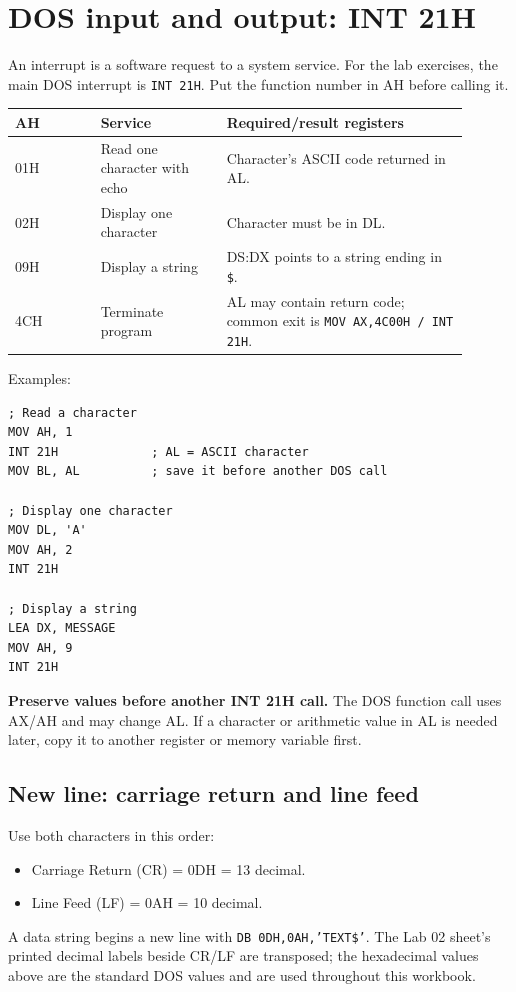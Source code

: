 \documentclass[11pt,a4paper]{article}
\begin{document}
\section{DOS input and output: INT 21H}
An interrupt is a software request to a system service. For the lab exercises, the main DOS interrupt is \texttt{INT 21H}. Put the function number in AH before calling it.
\begin{longtable}{p{0.17\linewidth}p{0.25\linewidth}p{0.48\linewidth}}
\toprule \textbf{AH} & \textbf{Service} & \textbf{Required/result registers}\\
\midrule
01H & Read one character with echo & Character's ASCII code returned in AL.\\
02H & Display one character & Character must be in DL.\\
09H & Display a string & DS:DX points to a string ending in \texttt{\$}.\\
4CH & Terminate program & AL may contain return code; common exit is \texttt{MOV AX,4C00H / INT 21H}.\\
\bottomrule
\end{longtable}
Examples:
\begin{lstlisting}[style=asm]
; Read a character
MOV AH, 1
INT 21H             ; AL = ASCII character
MOV BL, AL          ; save it before another DOS call

; Display one character
MOV DL, 'A'
MOV AH, 2
INT 21H

; Display a string
LEA DX, MESSAGE
MOV AH, 9
INT 21H
\end{lstlisting}
\begin{importantbox}
\textbf{Preserve values before another INT 21H call.} The DOS function call uses AX/AH and may change AL. If a character or arithmetic value in AL is needed later, copy it to another register or memory variable first.
\end{importantbox}

\subsection{New line: carriage return and line feed}
Use both characters in this order:
\begin{itemize}
\item Carriage Return (CR) = 0DH = 13 decimal.
\item Line Feed (LF) = 0AH = 10 decimal.
\end{itemize}
A data string begins a new line with \texttt{DB 0DH,0AH,'TEXT\$'}. The Lab 02 sheet's printed decimal labels beside CR/LF are transposed; the hexadecimal values above are the standard DOS values and are used throughout this workbook.
\end{document}
